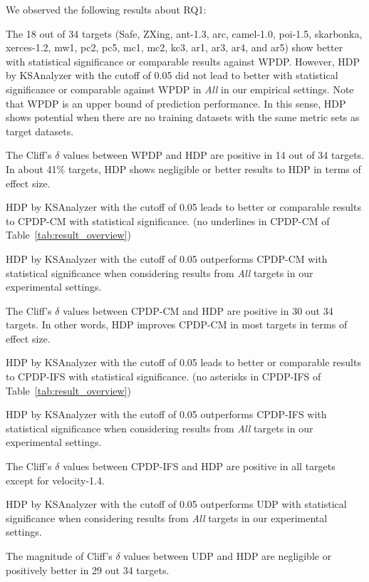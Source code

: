 We observed the following results about RQ1:
\squishlist
	\item The 18 out of 34 targets (Safe, ZXing, ant-1.3, arc, camel-1.0, poi-1.5, skarbonka, xerces-1.2, mw1, pc2, pc5, mc1, mc2, kc3, ar1, ar3, ar4, and ar5) show better with statistical significance or comparable results against WPDP.
  However, HDP by KSAnalyzer with the cutoff of
	0.05 did not lead to better with statistical
	significance or comparable against WPDP in {\em All} in our empirical settings. Note that WPDP is an upper bound of prediction performance. In this sense, HDP shows potential when there are no training datasets with the same metric sets as target datasets.
	\item The Cliff's $\delta$ values between WPDP and HDP are positive in 14 out of 34 targets. In about 41\% targets, HDP shows negligible or better results to HDP in terms of effect size.
	\item HDP by KSAnalyzer with the cutoff of 0.05
	leads to better or comparable results to CPDP-CM
	with statistical significance. (no underlines in CPDP-CM of
	Table~\ref{tab:result_overview})
	\item HDP by KSAnalyzer with the cutoff of 0.05 outperforms
	CPDP-CM with statistical significance
	when considering results from {\em All} targets in our experimental
	settings.
	\item The Cliff's $\delta$ values between CPDP-CM and HDP are positive in 30 out 34 targets. In other words, HDP improves CPDP-CM in most targets in terms of effect size.
	\item HDP by KSAnalyzer with the cutoff of 0.05
	leads to better or comparable results to CPDP-IFS with
	statistical significance. (no asterisks in CPDP-IFS of
	Table~\ref{tab:result_overview})
	\item HDP by KSAnalyzer with the cutoff of 0.05 outperforms
	CPDP-IFS with statistical significance
	when considering results from {\em All} targets in our experimental
	settings.
	\item The Cliff's $\delta$ values between CPDP-IFS and HDP are positive in all targets except for velocity-1.4.
  \item HDP by KSAnalyzer with the cutoff of 0.05 outperforms
	UDP with statistical significance
	when considering results from {\em All} targets in our experimental
	settings.
	\item The magnitude of Cliff's $\delta$ values between UDP and HDP are negligible or positively better in 29 out 34 targets.
\squishend

